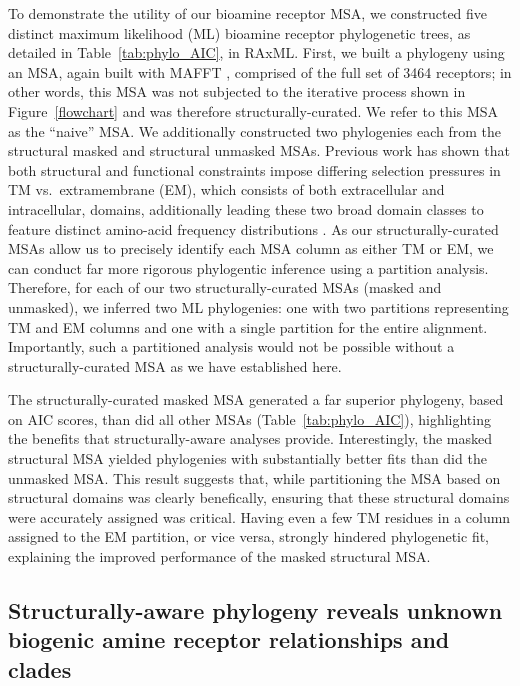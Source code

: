 \documentclass[fleqn,10pt]{wlpeerj}
\begin{document}
To demonstrate the utility of our bioamine receptor MSA, we constructed five distinct maximum likelihood (ML) bioamine receptor phylogenetic trees, as detailed in Table~\ref{tab:phylo_AIC}, in RAxML. First, we built a phylogeny using an MSA, again built with MAFFT \citep{mafftv7}, comprised of the full set of 3464 receptors; in other words, this MSA was not subjected to the iterative process shown in Figure~\ref{flowchart} and was therefore structurally-curated. We refer to this MSA as the ``naive'' MSA. We additionally constructed two phylogenies each from the structural masked and structural unmasked MSAs. Previous work has shown that both structural and functional constraints impose differing selection pressures in TM vs.\ extramembrane (EM), which consists of both extracellular and intracellular, domains, additionally leading these two broad domain classes to feature distinct amino-acid frequency distributions \cite{Tourasse2000,Stevens2001,Julenius2006,Oberai2009,SpielmanWilke2013,FranzosaXueXia2013}.
As our structurally-curated MSAs allow us to precisely identify each MSA column as either TM or EM, we can conduct far more rigorous phylogentic inference using a partition analysis. Therefore, for each of our two structurally-curated MSAs (masked and unmasked), we inferred two ML phylogenies: one with two partitions representing TM and EM columns and one with a single partition for the entire alignment. Importantly, such a partitioned analysis would not be possible without a structurally-curated MSA as we have established here.

The structurally-curated masked MSA generated a far superior phylogeny, based on AIC scores, than did all other MSAs (Table~\ref{tab:phylo_AIC}), highlighting the benefits that structurally-aware analyses provide. Interestingly, the masked structural MSA yielded phylogenies with substantially better fits than did the unmasked MSA. This result suggests that, while partitioning the MSA based on structural domains was clearly benefically, ensuring that these structural domains were accurately assigned was critical. Having even a few TM residues in a column assigned to the EM partition, or vice versa, strongly hindered phylogenetic fit, explaining the improved performance of the masked structural MSA.



\subsection*{Structurally-aware phylogeny reveals unknown biogenic amine receptor relationships and clades}
\end{document}
